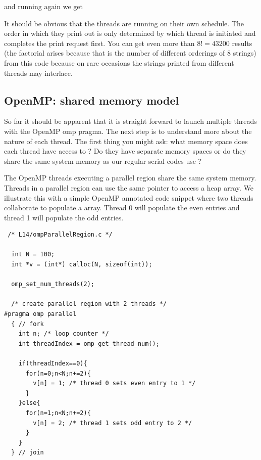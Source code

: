 and running again we get


It should be obvious that the threads are running on their own schedule. The order in which they print out is only determined by which thread is initiated and completes the print request first. You can get even more than $8!=43200$ results (the factorial arises because that is the number of different orderings of 8 strings) from this code because on rare occasions the strings printed from different threads may interlace.

\subsection{OpenMP: shared memory model}

So far it should be apparent that it is straight forward to launch multiple threads with the OpenMP omp pragma. The next step is to understand more about the nature of each thread. The first thing you might ask: what memory space does each thread have access to ? Do they have separate memory spaces or do they share the same system memory as our regular serial codes use ?

The OpenMP threads executing a parallel region share the same system memory. Threads in a parallel region can use the same pointer to access a heap array. We illustrate this with a simple OpenMP annotated code snippet where two threads collaborate to populate a array. Thread 0 will populate the even entries and thread 1 will populate the odd entries.

\begin{verbatim}
 /* L14/ompParallelRegion.c */
 
  int N = 100;
  int *v = (int*) calloc(N, sizeof(int));

  omp_set_num_threads(2);

  /* create parallel region with 2 threads */
#pragma omp parallel
  { // fork                                                                          
    int n; /* loop counter */
    int threadIndex = omp_get_thread_num();

    if(threadIndex==0){
      for(n=0;n<N;n+=2){
        v[n] = 1; /* thread 0 sets even entry to 1 */
      }
    }else{
      for(n=1;n<N;n+=2){
        v[n] = 2; /* thread 1 sets odd entry to 2 */
      }
    }
  } // join     
\end{verbatim}

